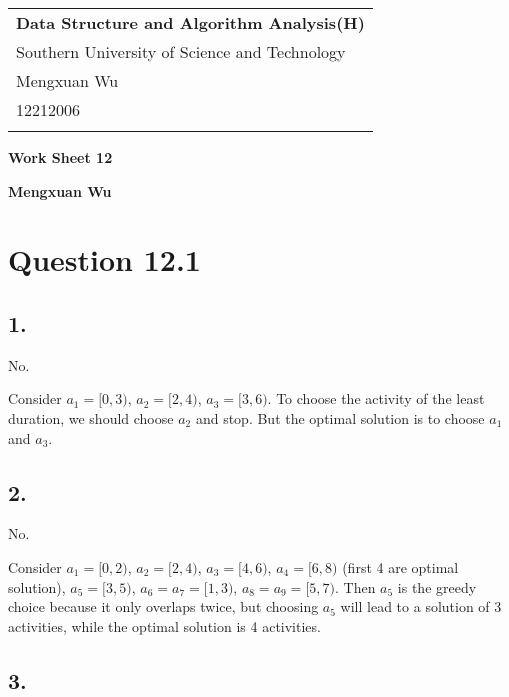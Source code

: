 \documentclass[a4paper,12pt]{article}
\begin{document}
\thispagestyle{empty} %

\begin{tabular}{p{15.5cm}}
{\large \bf Data Structure and Algorithm Analysis(H)} \\
Southern University of Science and Technology \\ Mengxuan Wu \\ 12212006 \\
\hline
\\
\end{tabular}

\vspace*{0.3cm} %

\begin{center}
	{\Large \bf Work Sheet 12}
	\vspace{2mm}

	{\bf Mengxuan Wu}
		
\end{center}  

\vspace{0.4cm}

\section*{Question 12.1}

\subsection*{1.}

No.

Consider $a_1 = [0,3)$, $a_2 = [2,4)$, $a_3 = [3,6)$.
To choose the activity of the least duration, we should choose $a_2$ and stop.
But the optimal solution is to choose $a_1$ and $a_3$.

\subsection*{2.}

No.

Consider $a_1 = [0,2)$, $a_2 = [2,4)$, $a_3 = [4,6)$, $a_4 = [6,8)$ (first 4 are optimal solution), $a_5 = [3,5)$, $a_6 = a_7 = [1,3)$, $a_8 = a_9 = [5,7)$.
Then $a_5$ is the greedy choice because it only overlaps twice, but choosing $a_5$ will lead to a solution of 3 activities, while the optimal solution is 4 activities.

\subsection*{3.}
\end{document}
